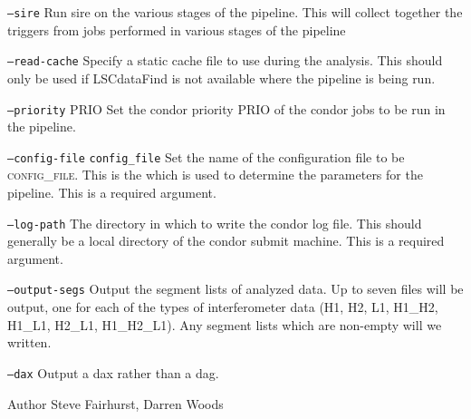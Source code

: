 \begin{entry}
\begin{entry}
\item[\texttt{--sire}] Run sire on the various stages of the pipeline.  This
will collect together the triggers from jobs performed in various stages of
the pipeline
\end{entry} 

\begin{entry}
\item[\texttt{--read-cache}] Specify a static cache file to use during the
analysis.  This should only be used if LSCdataFind is not available where the
pipeline is being run.
\end{entry} 

\begin{entry}
\item[\texttt{--priority} \textsc{PRIO}] Set the condor priority \textsc{PRIO}
of the condor jobs to be run in the pipeline.
\end{entry} 

\begin{entry}
\item[\texttt{--config-file} \texttt{config\_file}] Set the name of the
configuration file to be \textsc{config\_file}.  This is the which is used to
determine the parameters for the pipeline.  This is a required argument.
\end{entry} 
 
\begin{entry}
\item[\texttt{--log-path}] The directory in which to write the condor log
file.  This should generally be a local directory of the condor submit
machine.  This is a required argument.
\end{entry} 

\begin{entry}
\item[\texttt{--output-segs}] Output the segment lists of analyzed data.  Up
to seven files will be output, one for each of the types of interferometer
data (H1, H2, L1, H1\_H2, H1\_L1, H2\_L1, H1\_H2\_L1).  Any segment lists
which are non-empty will we written.
\end{entry} 

\begin{entry}
\item[\texttt{--dax}] Output a dax rather than a dag. 
\end{entry} 

\item[Author] 
Steve Fairhurst, Darren Woods
\end{entry}
